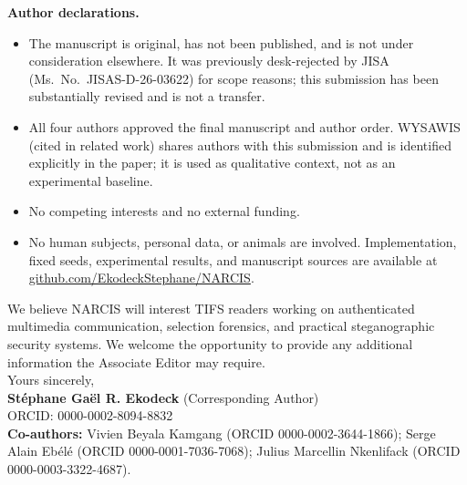 \documentclass[10pt,letterpaper]{article}
\newcommand{\clhead}[1]{\textcolor{ieeeblue}{\textbf{#1}}}
\begin{document}
\clhead{Author declarations.}
\begin{itemize}
\item The manuscript is original, has not been published, and is not under
  consideration elsewhere. It was previously desk-rejected by JISA
  (Ms.\ No.\ JISAS-D-26-03622) for scope reasons; this submission has
  been substantially revised and is not a transfer.
\item All four authors approved the final manuscript and author order.
  WYSAWIS (cited in related work) shares authors with this submission
  and is identified explicitly in the paper; it is used as qualitative
  context, not as an experimental baseline.
\item No competing interests and no external funding.
\item No human subjects, personal data, or animals are involved.
  Implementation, fixed seeds, experimental results, and manuscript
  sources are available at
  \href{https://github.com/EkodeckStephane/NARCIS}%
  {github.com/EkodeckStephane/NARCIS}.
\end{itemize}

We believe NARCIS will interest TIFS readers working on authenticated
multimedia communication, selection forensics, and practical steganographic
security systems. We welcome the opportunity to provide any additional
information the Associate Editor may require.\\[4pt]

Yours sincerely,\\[6pt]

\textbf{St\'ephane Ga\"el R. Ekodeck} (Corresponding Author)\\
ORCID: 0000-0002-8094-8832\\
\textbf{Co-authors:} Vivien Beyala Kamgang (ORCID 0000-0002-3644-1866);
Serge Alain Eb\'el\'e (ORCID 0000-0001-7036-7068);
Julius Marcellin Nkenlifack (ORCID 0000-0003-3322-4687).
\end{document}
